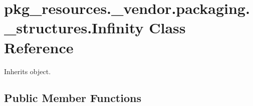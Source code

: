 \hypertarget{classpkg__resources_1_1__vendor_1_1packaging_1_1__structures_1_1_infinity}{}\section{pkg\+\_\+resources.\+\_\+vendor.\+packaging.\+\_\+structures.\+Infinity Class Reference}
\label{classpkg__resources_1_1__vendor_1_1packaging_1_1__structures_1_1_infinity}


Inherits object.

\subsection*{Public Member Functions}
